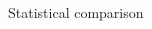 \documentclass[xcolor=x11names,compress]{beamer}
\renewcommand{\(}{\begin{columns}}
\renewcommand{\)}{\end{columns}}
\newcommand{\<}[1]{\begin{column}{#1}}
\renewcommand{\>}{\end{column}}
\begin{document}
\begin{frame}[t]{Statistical comparison}
    \begin{columns}[T] %
    \begin{column}[T]{5.0cm} %
    \end{column}
    \begin{column}[T]{4.5cm} %
    \end{column}
    \end{columns}
\end{frame}
\end{document}
